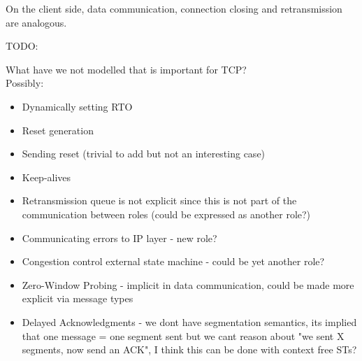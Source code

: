 \documentclass{article}
\newcommand{\todo}[1]{}
\renewcommand{\todo}[1]{{\color{red} TODO: {#1}}}
\begin{document}
On the client side, data communication, connection closing and retransmission are analogous.

\todo{What have we not modelled that is important for TCP? \\
Possibly:\\
\begin{itemize}
    \item Dynamically setting RTO
    \item Reset generation
    \item Sending reset (trivial to add but not an interesting case)
    \item Keep-alives
    \item Retransmission queue is not explicit since this is not part of the communication between roles (could be expressed as another role?)
    \item Communicating errors to IP layer - new role?
    \item Congestion control external state machine - could be yet another role?
    \item Zero-Window Probing - implicit in data communication, could be made more explicit via message types
    \item Delayed Acknowledgments - we dont have segmentation semantics, its implied that one message = one segment sent but we cant reason about "we sent X segments, now send an ACK", I think this can be done with context free STs?
\end{itemize}
}
\end{document}
